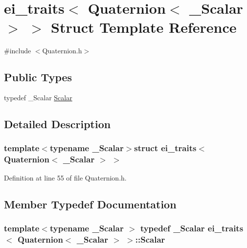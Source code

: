 \hypertarget{structei__traits_3_01_quaternion_3_01___scalar_01_4_01_4}{\section{ei\-\_\-traits$<$ Quaternion$<$ \-\_\-\-Scalar $>$ $>$ Struct Template Reference}
\label{structei__traits_3_01_quaternion_3_01___scalar_01_4_01_4}
}


{\ttfamily \#include $<$Quaternion.\-h$>$}

\subsection*{Public Types}
\begin{DoxyCompactItemize}
\item 
typedef \-\_\-\-Scalar \hyperlink{structei__traits_3_01_quaternion_3_01___scalar_01_4_01_4_a2655b17263f8987468e3ecf592021211}{Scalar}
\end{DoxyCompactItemize}


\subsection{Detailed Description}
\subsubsection*{template$<$typename \-\_\-\-Scalar$>$struct ei\-\_\-traits$<$ Quaternion$<$ \-\_\-\-Scalar $>$ $>$}



Definition at line 55 of file Quaternion.\-h.



\subsection{Member Typedef Documentation}
\hypertarget{structei__traits_3_01_quaternion_3_01___scalar_01_4_01_4_a2655b17263f8987468e3ecf592021211}{
\subsubsection[{Scalar}]{\setlength{\rightskip}{0pt plus 5cm}template$<$typename \-\_\-\-Scalar $>$ typedef \-\_\-\-Scalar {\bf ei\-\_\-traits}$<$ {\bf Quaternion}$<$ \-\_\-\-Scalar $>$ $>$\-::{\bf Scalar}}}\label{structei__traits_3_01_quaternion_3_01___scalar_01_4_01_4_a2655b17263f8987468e3ecf592021211}


